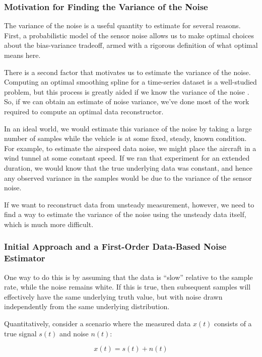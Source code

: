 \subsubsection{Motivation for Finding the Variance of the Noise}

The variance of the noise is a useful quantity to estimate for several reasons. First, a probabilistic model of the sensor noise allows us to make optimal choices about the bias-variance tradeoff, armed with a rigorous definition of what optimal means here.

There is a second factor that motivates us to estimate the variance of the noise. Computing an optimal smoothing spline for a time-series dataset is a well-studied problem, but this process is greatly aided if we know the variance of the noise \cite{wahba}. So, if we can obtain an estimate of noise variance, we've done most of the work required to compute an optimal data reconstructor.

In an ideal world, we would estimate this variance of the noise by taking a large number of samples while the vehicle is at some fixed, steady, known condition. For example, to estimate the airspeed data noise, we might place the aircraft in a wind tunnel at some constant speed. If we ran that experiment for an extended duration, we would know that the true underlying data was constant, and hence any observed variance in the samples would be due to the variance of the sensor noise.

If we want to reconstruct data from unsteady measurement, however, we need to find a way to estimate the variance of the noise using the unsteady data itself, which is much more difficult.

\subsubsection{Initial Approach and a First-Order Data-Based Noise Estimator}
\label{sec:sysid_first_order_noise_estimator}

One way to do this is by assuming that the data is ``slow'' relative to the sample rate, while the noise remains white. If this is true, then subsequent samples will effectively have the same underlying truth value, but with noise drawn independently from the same underlying distribution.

Quantitatively, consider a scenario where the measured data $x(t)$ consists of a true signal $s(t)$ and noise $n(t)$:

$$x(t) = s(t) + n(t)$$

